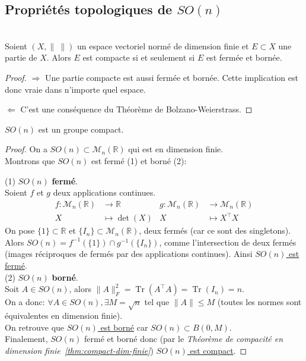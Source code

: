 \documentclass[12pt]{report}
\begin{document}
\subsection{Propriétés topologiques de \texorpdfstring{$SO(n)$}{SO (n)}}

\begin{theorem}\label{thm:compact-dim-finie}\leavevmode\\
Soient $(X,\|~\|)$ un espace vectoriel normé de dimension finie et $E\subset X$ une partie de $X$. Alors $E$ est compacte si et seulement si $E$ est fermée et bornée. 
\end{theorem}

\begin{proof}
$\Rightarrow$ Une partie compacte est aussi fermée et bornée. Cette implication est donc vraie dans n'importe quel espace.

$\Leftarrow$ C'est une conséquence du Théorème de Bolzano-Weierstrass.
\end{proof}

\begin{proposition}\label{prop:SO-compact}
$SO(n)$ est un groupe compact.
\end{proposition}

\begin{proof}
On a $SO(n)\subset \mathcal{M}_n(\mathbb{R})$ qui est en dimension finie.\\
Montrons que $SO(n)$ est fermé (1) et borné (2):

(1) $SO(n)$ \textbf{fermé}.\\
Soient $f$ et $g$ deux applications continues.
\[
\begin{aligned}
f \colon \mathcal{M}_n(\mathbb{R}) &\longrightarrow \mathbb{R}~&g \colon \mathcal{M}_n(\mathbb{R}) &\longrightarrow \mathcal{M}_n(\mathbb{R})\\
X &\longmapsto \det(X)&X &\longmapsto X^{\top}X
\end{aligned}
\]
On pose $\{1\}\subset\mathbb{R}$ et $\{I_n\}\subset\mathcal{M}_n(\mathbb{R})$, deux fermés (car ce sont des singletons).\\
Alors $SO(n)=f^{-1}(\{1\})\cap g^{-1}(\{I_n\})$, comme l'intersection de deux fermés (images réciproques de fermés par des applications continues).
Ainsi \underline{$SO(n)$ est fermé}.\\

(2) $SO(n)$ \textbf{borné}.\\
Soit $A\in SO(n)$, alors $\|A\|_F^2=\operatorname{Tr}(A^{\top}A)=\operatorname{Tr}(I_n)=n$.\\
On a donc: $\forall A\in SO(n), \exists M=\sqrt{n}$ tel que $\|A\|\leq M$ (toutes les normes sont équivalentes en dimension finie).\\
On retrouve que \underline{$SO(n)$ est borné} car $SO(n)\subset B(0,M)$.\\

Finalement, $SO(n)$ fermé et borné donc (par le \textit{Théorème de compacité en dimension finie~\ref{thm:compact-dim-finie}}) \underline{$SO(n)$ est compact}.
\end{proof}
\end{document}
